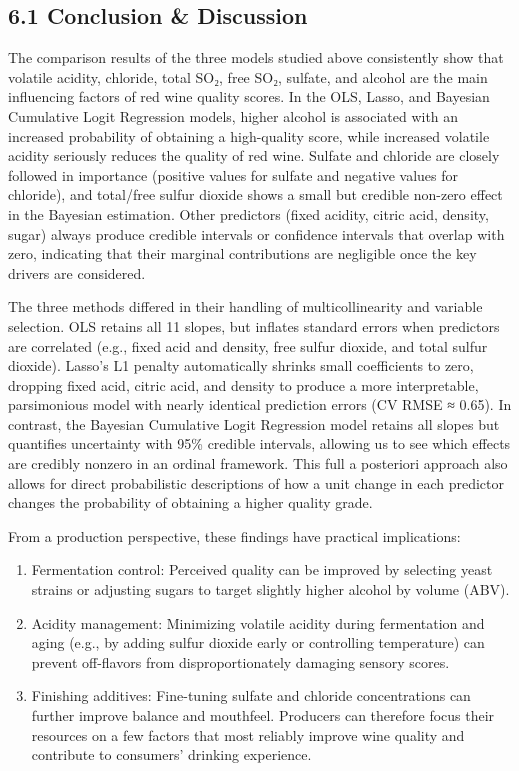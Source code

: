 \documentclass[
  doc,floatsintext]{apa6}
\begin{document}
\subsection{6.1 Conclusion \& Discussion}\label{conclusion-discussion}

The comparison results of the three models studied above consistently show that volatile acidity, chloride, total SO₂, free SO₂, sulfate, and alcohol are the main influencing factors of red wine quality scores. In the OLS, Lasso, and Bayesian Cumulative Logit Regression models, higher alcohol is associated with an increased probability of obtaining a high-quality score, while increased volatile acidity seriously reduces the quality of red wine. Sulfate and chloride are closely followed in importance (positive values for sulfate and negative values for chloride), and total/free sulfur dioxide shows a small but credible non-zero effect in the Bayesian estimation. Other predictors (fixed acidity, citric acid, density, sugar) always produce credible intervals or confidence intervals that overlap with zero, indicating that their marginal contributions are negligible once the key drivers are considered.

The three methods differed in their handling of multicollinearity and variable selection. OLS retains all 11 slopes, but inflates standard errors when predictors are correlated (e.g., fixed acid and density, free sulfur dioxide, and total sulfur dioxide). Lasso's L1 penalty automatically shrinks small coefficients to zero, dropping fixed acid, citric acid, and density to produce a more interpretable, parsimonious model with nearly identical prediction errors (CV RMSE ≈ 0.65). In contrast, the Bayesian Cumulative Logit Regression model retains all slopes but quantifies uncertainty with 95\% credible intervals, allowing us to see which effects are credibly nonzero in an ordinal framework. This full a posteriori approach also allows for direct probabilistic descriptions of how a unit change in each predictor changes the probability of obtaining a higher quality grade.

From a production perspective, these findings have practical implications:

\begin{enumerate}
\def\labelenumi{\arabic{enumi}.}
\item
  Fermentation control: Perceived quality can be improved by selecting yeast strains or adjusting sugars to target slightly higher alcohol by volume (ABV).
\item
  Acidity management: Minimizing volatile acidity during fermentation and aging (e.g., by adding sulfur dioxide early or controlling temperature) can prevent off-flavors from disproportionately damaging sensory scores.
\item
  Finishing additives: Fine-tuning sulfate and chloride concentrations can further improve balance and mouthfeel.
  Producers can therefore focus their resources on a few factors that most reliably improve wine quality and contribute to consumers' drinking experience.
\end{enumerate}
\end{document}
